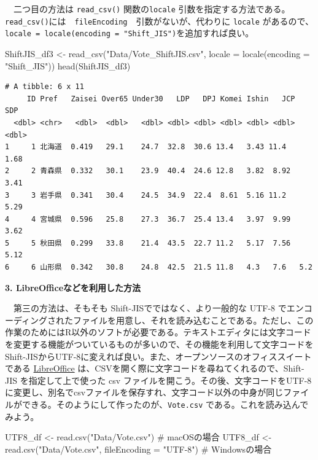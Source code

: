 \documentclass[
  a4paper,
  pandoc,
  ja=standard,
  jafont=haranoaji]{bxjsbook}
\newenvironment{Shaded}{\begin{snugshade}}{\end{snugshade}}
\newcommand{\AttributeTok}[1]{\textcolor[rgb]{0.00,0.48,0.65}{#1}}
\newcommand{\CommentTok}[1]{\textcolor[rgb]{0.37,0.37,0.37}{#1}}
\newcommand{\FunctionTok}[1]{\textcolor[rgb]{0.28,0.35,0.67}{#1}}
\newcommand{\NormalTok}[1]{\textcolor[rgb]{0.00,0.48,0.65}{#1}}
\newcommand{\OtherTok}[1]{\textcolor[rgb]{0.00,0.48,0.65}{#1}}
\newcommand{\StringTok}[1]{\textcolor[rgb]{0.13,0.47,0.30}{#1}}
\begin{document}
　二つ目の方法は \texttt{read\_csv()} 関数の\texttt{locale}
引数を指定する方法である。\texttt{read\_csv()}には　\texttt{fileEncoding}　引数がないが、代わりに
\texttt{locale}
があるので、\texttt{locale\ =\ locale(encoding\ =\ "Shift\_JIS")}を追加すれば良い。

\begin{Shaded}
\begin{Highlighting}[numbers=left,,]
\NormalTok{ShiftJIS\_df3 }\OtherTok{\textless{}{-}} \FunctionTok{read\_csv}\NormalTok{(}\StringTok{"Data/Vote\_ShiftJIS.csv"}\NormalTok{, }
                         \AttributeTok{locale =} \FunctionTok{locale}\NormalTok{(}\AttributeTok{encoding =} \StringTok{"Shift\_JIS"}\NormalTok{))}
\FunctionTok{head}\NormalTok{(ShiftJIS\_df3)}
\end{Highlighting}
\end{Shaded}

\begin{verbatim}
# A tibble: 6 x 11
     ID Pref   Zaisei Over65 Under30   LDP   DPJ Komei Ishin   JCP   SDP
  <dbl> <chr>   <dbl>  <dbl>   <dbl> <dbl> <dbl> <dbl> <dbl> <dbl> <dbl>
1     1 北海道  0.419   29.1    24.7  32.8  30.6 13.4   3.43 11.4   1.68
2     2 青森県  0.332   30.1    23.9  40.4  24.6 12.8   3.82  8.92  3.41
3     3 岩手県  0.341   30.4    24.5  34.9  22.4  8.61  5.16 11.2   5.29
4     4 宮城県  0.596   25.8    27.3  36.7  25.4 13.4   3.97  9.99  3.62
5     5 秋田県  0.299   33.8    21.4  43.5  22.7 11.2   5.17  7.56  5.12
6     6 山形県  0.342   30.8    24.8  42.5  21.5 11.8   4.3   7.6   5.2 
\end{verbatim}

\textbf{3. LibreOfficeなどを利用した方法}

　第三の方法は、そもそも Shift-JISでではなく、より一般的な UTF-8
でエンコーディングされたファイルを用意し、それを読み込むことである。ただし、この作業のためにはR以外のソフトが必要である。テキストエディタには文字コードを変更する機能がついているものが多いので、その機能を利用して文字コードを
Shift-JISからUTF-8に変えれば良い。また、オープンソースのオフィススイートである
\href{https://ja.libreoffice.org/}{LibreOffice}
は、CSVを開く際に文字コードを尋ねてくれるので、Shift-JIS
を指定して上で使った csv
ファイルを開こう。その後、文字コードをUTF-8に変更し、別名でcsvファイルを保存すれ、文字コード以外の中身が同じファイルができる。そのようにして作ったのが、\texttt{Vote.csv}
である。これを読み込んでみよう。

\begin{Shaded}
\begin{Highlighting}[]
\NormalTok{UTF8\_df }\OtherTok{\textless{}{-}} \FunctionTok{read.csv}\NormalTok{(}\StringTok{"Data/Vote.csv"}\NormalTok{) }\CommentTok{\# macOSの場合}
\NormalTok{UTF8\_df }\OtherTok{\textless{}{-}} \FunctionTok{read.csv}\NormalTok{(}\StringTok{"Data/Vote.csv"}\NormalTok{, }\AttributeTok{fileEncoding =} \StringTok{"UTF{-}8"}\NormalTok{) }\CommentTok{\# Windowsの場合}
\end{Highlighting}
\end{Shaded}
\end{document}
